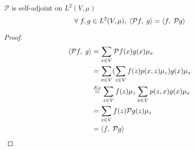 \documentclass[main]{subfiles}
\begin{document}
\begin{prop}
    $\mathcal{P}$ is self-adjoint on $L^2(V,\mu)$
    $$\forall\;f,g \in L^2(V,\mu),\;\left\langle\mathcal{P}f,\;g\right\rangle = \left\langle f,\;\mathcal{P}g\right\rangle$$
    \begin{proof}
        \begin{align*}
            \left\langle\mathcal{P}f,\;g\right\rangle & = \sum_{x \in V}\mathcal{P}f(x)g(x)\mu_x                              \\
                                 & = \sum_{x \in V}(\sum_{z \in V}f(z)p(x,z)\mu_z)g(x)\mu_x              \\
                                 & \stackrel{Ex}{=} \sum_{z \in V}f(z)\mu_z\sum_{x \in V}p(z,x)g(x)\mu_x \\
                                 & = \sum_{z \in V}f(z)\mathcal{P}g(z)\mu_z                              \\
                                 & = \left\langle f,\;\mathcal{P}g\right\rangle
        \end{align*}
    \end{proof}
\end{prop}
\end{document}
